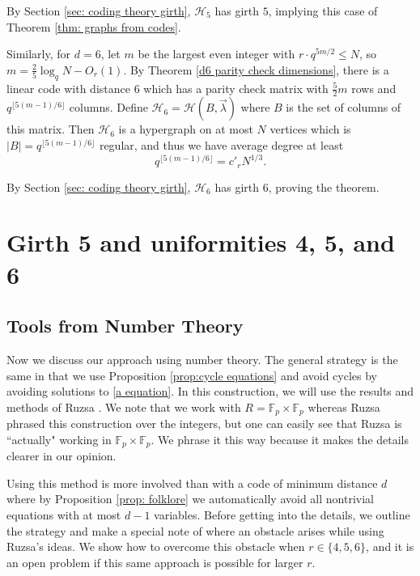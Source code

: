 \documentclass[12pt]{article}%
\begin{document}
By Section \ref{sec: coding theory girth}, $\mathcal{H}_5$ has girth $5$, implying this case of Theorem \ref{thm: graphs from codes}. 

Similarly, for $d=6$, let $m$ be the largest even integer with $r\cdot q^{5m/2} \leq N$, so $m = \frac{2}{5} \log_q N - O_r(1)$. By Theorem \ref{d6 parity check dimensions}, there is a linear code with distance $6$ which has a parity check matrix with $\frac{5}{2}m$ rows and $q^{\lfloor 5(m-1)/6\rfloor}$ columns. Define $\mathcal{H}_6 = \mathcal{H}(B, \vec{\lambda})$ where $B$ is the set of columns of this matrix. Then $\mathcal{H}_6$ is a hypergraph on at most $N$ vertices which is $|B| = q^{\lfloor 5(m-1)/6\rfloor}$ regular, and thus we have average degree at least 
\[
q^{\lfloor 5(m-1)/6\rfloor} = c'_r N^{1/3}.
\]

By Section \ref{sec: coding theory girth}, $\mathcal{H}_6$ has girth $6$, proving the theorem.

\section{Girth 5 and uniformities 4, 5, and 6}\label{sec: ruzsa method}


\subsection{Tools from Number Theory}

Now we discuss our approach using number theory.  The general strategy is the same in that we use Proposition \ref{prop:cycle equations} and avoid cycles by avoiding solutions to \eqref{a equation}. 
In this construction, we will use the results and methods of Ruzsa \cite{Ruzsa}.  We note that we work with $R = \mathbb{F}_p \times \mathbb{F}_p$ whereas Ruzsa phrased this construction over the integers, but one can easily see that Ruzsa is ``actually" working in $\mathbb{F}_p \times \mathbb{F}_p$.  We phrase it this way because it makes the details clearer in our opinion.


Using this method is more involved than with a code of minimum distance $d$ where by Proposition \ref{prop: folklore} we automatically avoid all nontrivial equations with at most $d-1$ variables. Before getting into the details, we outline the strategy and make a special note of where an obstacle arises while using Ruzsa's ideas. We show how to overcome this obstacle when $r\in \{4,5,6\}$, {and it is an open problem if this same approach is possible for larger $r$.}   
\end{document}
